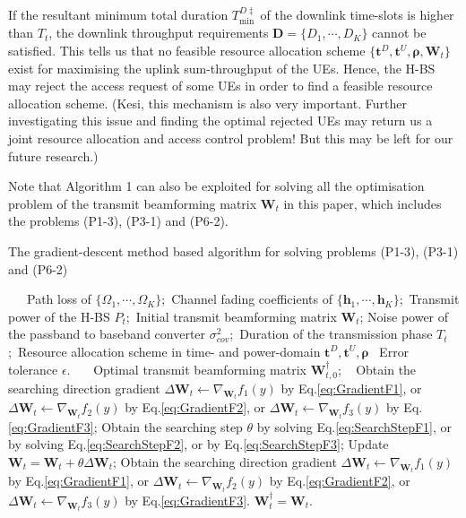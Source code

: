 \documentclass[12pt,draftcls,onecolumn,journal]{IEEEtran}
\begin{document}
If the resultant minimum total duration $T_{\min}^{D\ddagger}$ of the downlink time-slots is higher than $T_t$, the downlink throughput requirements $\mathbf{D}=\{D_1,\cdots,D_K\}$ cannot be satisfied. This tells us that no feasible resource allocation scheme $\{\mathbf{t}^D, \mathbf{t}^U, \boldsymbol{\rho}, \mathbf{W}_t\}$ exist for maximising the uplink sum-throughput of the UEs. Hence, the H-BS may reject the access request of some UEs in order to find a feasible resource allocation scheme. {\color{red} (Kesi, this mechanism is also very important. Further investigating this issue and finding the optimal rejected UEs may return us a joint resource allocation and access control problem! But this may be left for our future research.)}

Note that Algorithm 1 can also be exploited for solving all the optimisation problem of the transmit beamforming matrix $\mathbf{W}_t$ in this paper, which includes the problems (P1-3), (P3-1) and (P6-2). 

\begin{algorithm}[!t]
	\caption{The gradient-descent method based algorithm for solving problems (P1-3), (P3-1) and (P6-2)}
	\footnotesize
	\begin{algorithmic}[1]
		\REQUIRE ~~\
		Path loss of $\{\Omega_1,\cdots,\Omega_K\}$;\
		Channel fading coefficients of $\{\mathbf{h}_1,\cdots,\mathbf{h}_K\}$;\
		Transmit power of the H-BS $P_{t}$;\
		Initial transmit beamforming matrix $\mathbf{W}_t$;
		Noise power of the passband to baseband converter $\sigma^2_{cov}$;\
		Duration of the transmission phase $T_t$;\
		Resource allocation scheme in time- and power-domain $\mathbf{t}^D, \mathbf{t}^U, \boldsymbol{\rho}$ \
		Error tolerance $\epsilon$.
		\ENSURE ~~\
		Optimal transmit beamforming matrix $\mathbf{W}_{t,0}^{\dagger}$; \
		\STATE Obtain the searching direction gradient $\Delta{\mathbf{W}_t}\leftarrow \nabla_{\mathbf{W}_t} f_1(y)$ by Eq.\eqref{eq:GradientF1}, or $\Delta{\mathbf{W}_t}\leftarrow\nabla_{\mathbf{W}_t} f_2(y)$ by Eq.\eqref{eq:GradientF2}, or $\Delta{\mathbf{W}_t}\leftarrow\nabla_{\mathbf{W}_t} f_3(y)$ by Eq.\eqref{eq:GradientF3};
		\WHILE{$||\Delta\mathbf{W}_t||\leq \epsilon$}
		\STATE Obtain the searching step $\theta$ by solving Eq.\eqref{eq:SearchStepF1}, or by solving Eq.\eqref{eq:SearchStepF2}, or by Eq.\eqref{eq:SearchStepF3};
		\STATE Update $\mathbf{W}_t = \mathbf{W}_t + \theta \Delta \mathbf{W}_t$;
		\STATE Obtain the searching direction gradient $\Delta{\mathbf{W}_t}\leftarrow \nabla_{\mathbf{W}_t} f_1(y)$ by Eq.\eqref{eq:GradientF1}, or $\Delta{\mathbf{W}_t}\leftarrow\nabla_{\mathbf{W}_t} f_2(y)$ by Eq.\eqref{eq:GradientF2}, or $\Delta{\mathbf{W}_t}\leftarrow\nabla_{\mathbf{W}_t} f_3(y)$ by Eq.\eqref{eq:GradientF3}.
		\ENDWHILE
		\RETURN $\mathbf{W}_t^{\dagger} = \mathbf{W}_t$.
	\end{algorithmic}
\end{algorithm}
\end{document}
